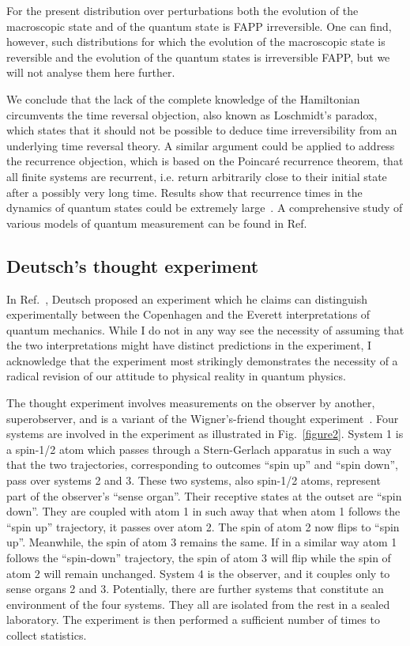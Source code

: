 \documentclass[12pt,a4]{article}
\begin{document}
For the present distribution over perturbations both the evolution of the macroscopic state and of the quantum state is FAPP irreversible. One can find, however, such distributions for which the evolution of the macroscopic state is reversible and the evolution of the quantum states is irreversible FAPP, but we will not analyse them here further. 

We conclude that the lack of the complete knowledge of the Hamiltonian circumvents the time reversal objection, also known as Loschmidt's paradox, which states that it should not be possible to deduce time irreversibility from an underlying time reversal theory. A similar argument could be applied to address the recurrence objection, which is based on the Poincar{\' e} recurrence theorem, that all finite systems are recurrent, i.e. return arbitrarily close to their initial state after a possibly very long time. Results show that recurrence times in the dynamics of quantum states could be extremely large~\cite{peres4}. A comprehensive study of various models of quantum measurement can be found in Ref.~\cite{balian}


\subsection*{Deutsch's thought experiment}

In Ref.~\cite{deutsch}, Deutsch proposed an experiment which he claims can distinguish experimentally between the Copenhagen and the Everett interpretations of quantum mechanics. While I do not in any way see the necessity of assuming that the two interpretations might have distinct predictions in the experiment, I acknowledge that the experiment most strikingly demonstrates the necessity of a radical revision of our attitude to physical reality in quantum physics.

The thought experiment involves measurements on the observer by another, superobserver, and is a variant of the Wigner's-friend thought experiment~\cite{wigner1}. Four systems are involved in the experiment as illustrated in Fig.~\ref{figure2}. System 1 is a spin-1/2 atom which passes through a Stern-Gerlach apparatus in such a way that the two trajectories, corresponding to outcomes ``spin up'' and ``spin down'', pass over systems 2 and 3. These two systems, also spin-1/2 atoms, represent part of the observer's ``sense organ''. Their receptive states at the outset are ``spin down''. They are coupled with atom 1 in such away that when  atom 1 follows the ``spin up'' trajectory, it passes over atom 2. The spin of atom 2 now flips to ``spin up''. Meanwhile, the spin of atom 3 remains the same. If in a similar way atom 1 follows the ``spin-down'' trajectory, the spin of atom 3 will flip while the spin of atom 2 will remain unchanged. System 4 is the observer, and it couples only to sense organs 2 and 3. Potentially, there are further systems that constitute an environment of the four systems. They all are isolated from the rest in a sealed laboratory. The experiment is then performed a sufficient number of times to collect statistics.
\end{document}
